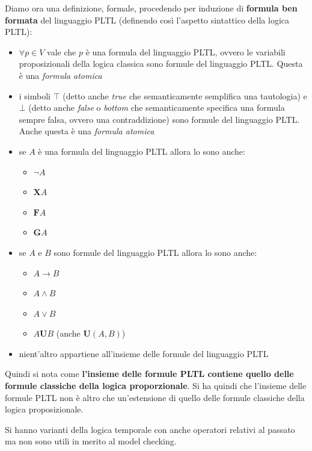\documentclass[a4paper,12pt, oneside]{book}
\begin{document}
\begin{definizione}
  Diamo ora una definizione, formale, procedendo per induzione di
  \textbf{formula ben formata} del linguaggio PLTL (definendo così l'aspetto
  sintattico della logica PLTL): 
  \begin{itemize}
    \item $\forall p\in V$ vale che $p$ è una formula del linguaggio PLTL,
    ovvero le variabili proposizionali della logica classica sono formule del
    linguaggio PLTL. Questa è una \emph{formula atomica}
    \item i simboli $\top$ (detto anche \emph{true} che semanticamente
    semplifica
    una tautologia) e $\bot$ (detto anche \textit{false} o \emph{bottom} che
    semanticamente specifica una formula sempre falsa, ovvero una
    contraddizione) sono formule del linguaggio PLTL. Anche questa è una
    \emph{formula atomica}
    \item se $A$ è una formula del linguaggio PLTL allora lo sono anche:
    \begin{itemize}[label=$\ast$]
      \item $\neg A$
      \item $\mathbf{X}A$
      \item $\mathbf{F}A$
      \item $\mathbf{G}A$
    \end{itemize}
   
    \item  se $A$ e $B$ sono formule del linguaggio PLTL allora lo sono anche:
    \begin{itemize}[label=$\ast$]
      \item $A\to B$
      \item $A\land B$
      \item $A\lor B$
      \item $A\mathbf{U}B$ (anche $\mathbf{U}(A,B)$)
    \end{itemize}
    \item nient'altro appartiene all'insieme delle formule del linguaggio PLTL
  \end{itemize}
  Quindi si nota come \textbf{l'insieme delle formule PLTL contiene quello delle
    formule classiche della logica proporzionale}. Si ha quindi che l'insieme
  delle formule PLTL non è altro che un'estensione di quello delle formule
  classiche della logica proposizionale.
\end{definizione}
Si hanno varianti della logica temporale con anche operatori relativi al passato
ma non sono utili in merito al model checking.
\end{document}
